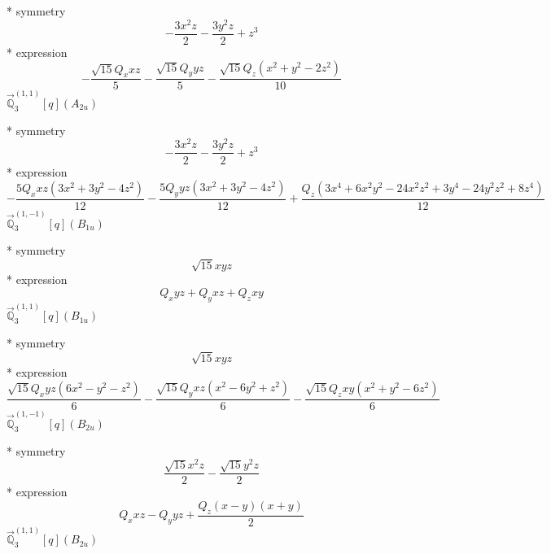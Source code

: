 \documentclass[fleqn,8pt]{jsarticle}
\begin{document}
\noindent\quad ** symmetry
\begin{dmath*}
- \frac{3 x^{2} z}{2} - \frac{3 y^{2} z}{2} + z^{3}
\end{dmath*}
\noindent\quad ** expression
\begin{dmath*}
- \frac{\sqrt{15} Q_{x} x z}{5} - \frac{\sqrt{15} Q_{y} y z}{5} - \frac{\sqrt{15} Q_{z} \left(x^{2} + y^{2} - 2 z^{2}\right)}{10}
\end{dmath*}
\noindent\quad $\vec{\mathbb{Q}}_{3}^{(1,1)}[q](A_{2u})$

\noindent\quad ** symmetry
\begin{dmath*}
- \frac{3 x^{2} z}{2} - \frac{3 y^{2} z}{2} + z^{3}
\end{dmath*}
\noindent\quad ** expression
\begin{dmath*}
- \frac{5 Q_{x} x z \left(3 x^{2} + 3 y^{2} - 4 z^{2}\right)}{12} - \frac{5 Q_{y} y z \left(3 x^{2} + 3 y^{2} - 4 z^{2}\right)}{12} + \frac{Q_{z} \left(3 x^{4} + 6 x^{2} y^{2} - 24 x^{2} z^{2} + 3 y^{4} - 24 y^{2} z^{2} + 8 z^{4}\right)}{12}
\end{dmath*}
\noindent\quad $\vec{\mathbb{Q}}_{3}^{(1,-1)}[q](B_{1u})$

\noindent\quad ** symmetry
\begin{dmath*}
\sqrt{15} x y z
\end{dmath*}
\noindent\quad ** expression
\begin{dmath*}
Q_{x} y z + Q_{y} x z + Q_{z} x y
\end{dmath*}
\noindent\quad $\vec{\mathbb{Q}}_{3}^{(1,1)}[q](B_{1u})$

\noindent\quad ** symmetry
\begin{dmath*}
\sqrt{15} x y z
\end{dmath*}
\noindent\quad ** expression
\begin{dmath*}
\frac{\sqrt{15} Q_{x} y z \left(6 x^{2} - y^{2} - z^{2}\right)}{6} - \frac{\sqrt{15} Q_{y} x z \left(x^{2} - 6 y^{2} + z^{2}\right)}{6} - \frac{\sqrt{15} Q_{z} x y \left(x^{2} + y^{2} - 6 z^{2}\right)}{6}
\end{dmath*}
\noindent\quad $\vec{\mathbb{Q}}_{3}^{(1,-1)}[q](B_{2u})$

\noindent\quad ** symmetry
\begin{dmath*}
\frac{\sqrt{15} x^{2} z}{2} - \frac{\sqrt{15} y^{2} z}{2}
\end{dmath*}
\noindent\quad ** expression
\begin{dmath*}
Q_{x} x z - Q_{y} y z + \frac{Q_{z} \left(x - y\right) \left(x + y\right)}{2}
\end{dmath*}
\noindent\quad $\vec{\mathbb{Q}}_{3}^{(1,1)}[q](B_{2u})$
\end{document}
